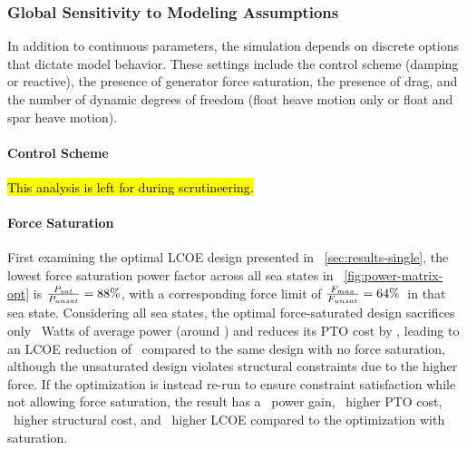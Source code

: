 \subsubsection{Global Sensitivity to Modeling Assumptions}
\label{sec:sensitivity-model-assumptions}
In addition to continuous parameters, the simulation depends on discrete options that dictate model behavior.
These settings include the control scheme (damping or reactive), the presence of generator force saturation, the presence of drag, and the number of dynamic degrees of freedom (float heave motion only or float and spar heave motion).

\paragraph{Control Scheme}
\hl{This analysis is left for during scrutineering.}

\paragraph{Force Saturation}
First examining the optimal LCOE design presented in \sectionautorefname~\ref{sec:results-single}, the lowest force saturation power factor across all sea states in \figureautorefname~\ref{fig:power-matrix-opt} is $\frac{P_{sat}}{P_{unsat}}=88\%$, with a corresponding force limit of $\frac{F_{max}}{F_{unsat}}=64\%$~in that sea state. 
Considering all sea states, the optimal force-saturated design sacrifices only \powerLossForceSatMinLCOE~Watts of average power (around \pctPowerLossForceSatMinLCOE) and reduces its PTO cost by \pctPTOSavingsForceSatMinLCOE, leading to an LCOE reduction of \pctImproveLCOEForceSatMinLCOE~compared to the same design with no force saturation, although the unsaturated design violates structural constraints due to the higher force.
If the optimization is instead re-run to ensure constraint satisfaction while not allowing force saturation, the result has a \pctPowerLossForceSatOptMinLCOE~power gain, \pctPTOSavingsForceSatOptMinLCOE~higher PTO cost, \pctStructSavingsForceSatOptMinLCOE~higher structural cost, and \pctImproveLCOEForceSatOptMinLCOE~higher LCOE compared to the optimization with saturation.

